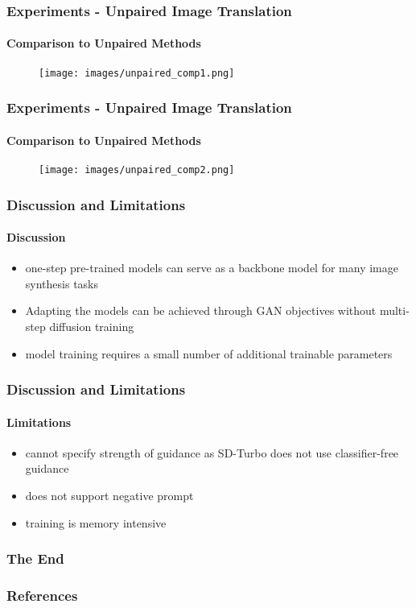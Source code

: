\documentclass[aspectratio=169, lecture, amberg]{OTHAWbeamer}
\begin{document}
\begin{frame}
    \frametitle{Experiments - Unpaired Image Translation}
    \framesubtitle{Comparison to Unpaired Methods}
    \begin{figure}
        \centering
        \texttt{[image: images/unpaired\_comp1.png]}
        
    \end{figure}
\end{frame}

\begin{frame}
    \frametitle{Experiments - Unpaired Image Translation}
    \framesubtitle{Comparison to Unpaired Methods}
    \begin{figure}
        \centering
        \texttt{[image: images/unpaired\_comp2.png]}
            
    \end{figure}
\end{frame}

\begin{frame}
\frametitle{Discussion and Limitations}
\framesubtitle{Discussion}
\begin{itemize}
    \item one-step pre-trained models can serve as a backbone model for many image synthesis tasks
    \item Adapting the models can be achieved through GAN objectives without multi-step diffusion training
    \item model training requires a small number of additional trainable parameters
\end{itemize}
\end{frame}

\begin{frame}
\frametitle{Discussion and Limitations}
\framesubtitle{Limitations}
\begin{itemize}
    \item cannot specify strength of guidance as SD-Turbo does not use classifier-free guidance
    \item does not support negative prompt
    \item training is memory intensive
\end{itemize}

\end{frame}

\begin{frame}
\frametitle{The End}
\begin{center}
\scalebox{2}{Questions?}
\end{center}
\end{frame}

\begin{frame}[allowframebreaks]
\frametitle{References}
\printbibliography
\end{frame}
\end{document}
